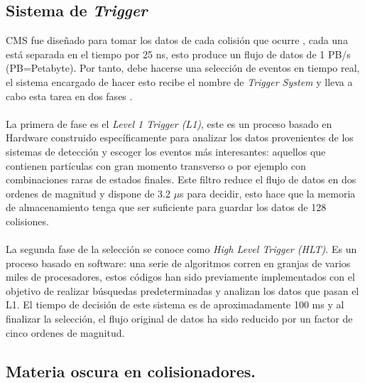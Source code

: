 \subsection{Sistema de \textit{Trigger}}

CMS fue diseñado para tomar los datos de cada colisión que ocurre	, cada una está separada en el tiempo por 25 ns, esto produce un flujo de datos de 1 PB/s (PB=Petabyte). Por tanto, debe hacerse una selección de eventos en tiempo real, el sistema encargado de hacer esto recibe el nombre de \textit{Trigger System} y lleva a cabo esta tarea en dos fases \cite{CMSTrigger}. 
\\
\\
La primera de fase es el \textit{Level 1 Trigger (L1)}, este es un proceso basado en Hardware construido específicamente para analizar los datos provenientes de los sistemas de detección y escoger los eventos más interesantes: aquellos que contienen partículas con gran momento transverso o por ejemplo con combinaciones raras de estados finales. Este filtro reduce el flujo de datos en dos ordenes de magnitud y dispone de 3.2 $\mu$s para decidir, esto hace que la memoria de almacenamiento tenga que ser suficiente para guardar los datos de 128  colisiones.
\\
\\
La segunda fase de la selección se conoce como \textit{High Level Trigger (HLT)}. Es un proceso basado en software: una serie de algoritmos corren en granjas de varios miles de procesadores, estos códigos han sido previamente implementados con el objetivo de realizar búsquedas predeterminadas y analizan los datos que pasan el L1. El tiempo de decisión de este sistema es de aproximadamente 100 ms y al finalizar la selección, el flujo original de datos ha sido reducido por un factor de cinco ordenes de magnitud.

\subsection{Materia oscura en colisionadores.}


